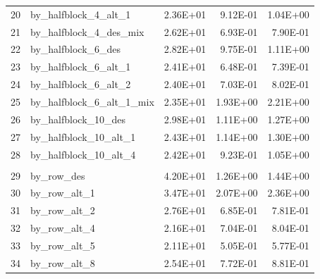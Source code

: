 \documentclass[11pt]{article}
\begin{document}
\begin{table}[htbp]
\begin{tabular}{rlrrr}
    20    & by\_halfblock\_4\_alt\_1 & 2.36E+01 & 9.12E-01 & 1.04E+00 \\
    21    & by\_halfblock\_4\_des\_mix & 2.62E+01 & 6.93E-01 & 7.90E-01 \\
    22    & by\_halfblock\_6\_des & 2.82E+01 & 9.75E-01 & 1.11E+00 \\
    23    & by\_halfblock\_6\_alt\_1 & 2.41E+01 & 6.48E-01 & 7.39E-01 \\
    24    & by\_halfblock\_6\_alt\_2 & 2.40E+01 & 7.03E-01 & 8.02E-01 \\
    25    & by\_halfblock\_6\_alt\_1\_mix & 2.35E+01 & 1.93E+00 & 2.21E+00 \\
    26    & by\_halfblock\_10\_des & 2.98E+01 & 1.11E+00 & 1.27E+00 \\
    27    & by\_halfblock\_10\_alt\_1 & 2.43E+01 & 1.14E+00 & 1.30E+00 \\
    28    & by\_halfblock\_10\_alt\_4 & 2.42E+01 & 9.23E-01 & 1.05E+00 \\
          &       &       &       &  \\
    29    & by\_row\_des & 4.20E+01 & 1.26E+00 & 1.44E+00 \\
    30    & by\_row\_alt\_1 & 3.47E+01 & 2.07E+00 & 2.36E+00 \\
    31    & by\_row\_alt\_2 & 2.76E+01 & 6.85E-01 & 7.81E-01 \\
    32    & by\_row\_alt\_4 & 2.16E+01 & 7.04E-01 & 8.04E-01 \\
    33    & by\_row\_alt\_5 & 2.11E+01 & 5.05E-01 & 5.77E-01 \\
    34    & by\_row\_alt\_8 & 2.54E+01 & 7.72E-01 & 8.81E-01 \\

\end{tabular}
\end{table}
\end{document}
